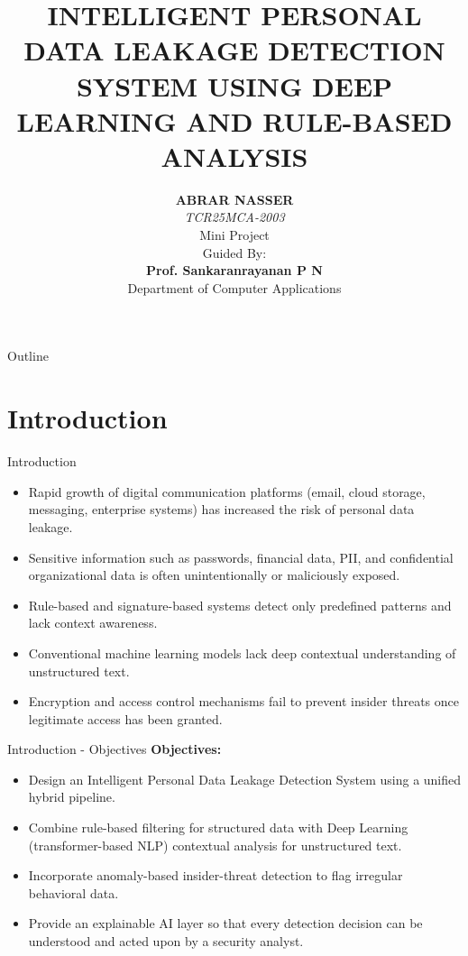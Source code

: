\documentclass{beamer}
\title{INTELLIGENT PERSONAL DATA LEAKAGE DETECTION SYSTEM USING DEEP LEARNING AND RULE-BASED ANALYSIS}
\author{\textbf{ABRAR NASSER} \\ \textit{TCR25MCA-2003} \\[0.6cm]     
    Mini Project  \\[13mm]     
    Guided By: \\
    \textbf{Prof. Sankaranrayanan P N} \\[0.3cm]
    Department of Computer Applications
}
\date{}
\begin{document}
\begin{frame}[plain]
  \titlepage
\end{frame}

\begin{frame}[allowframebreaks]{Outline}
\setlength{\parskip}{1pt}   
\setlength{\itemsep}{2pt}   
\tableofcontents[
    sectionstyle=show/show,     
    subsectionstyle=hide,       
    subsubsectionstyle=hide
]
\end{frame}

\section{Introduction}
\begin{frame}{Introduction}
\begin{itemize}
  \justifying
  \item Rapid growth of digital communication platforms (email, cloud storage, messaging, enterprise systems) has increased the risk of personal data leakage.
  \item Sensitive information such as passwords, financial data, PII, and confidential organizational data is often unintentionally or maliciously exposed.
  \item Rule-based and signature-based systems detect only predefined patterns and lack context awareness.
  \item Conventional machine learning models lack deep contextual understanding of unstructured text.
  \item Encryption and access control mechanisms fail to prevent insider threats once legitimate access has been granted.
\end{itemize}
\end{frame}

\begin{frame}{Introduction - Objectives}
\textbf{Objectives:}
\vspace{0.3cm}
\begin{itemize}
    \justifying
    \item Design an Intelligent Personal Data Leakage Detection System using a unified hybrid pipeline.
    \item Combine rule-based filtering for structured data with Deep Learning (transformer-based NLP) contextual analysis for unstructured text.
    \item Incorporate anomaly-based insider-threat detection to flag irregular behavioral data.
    \item Provide an explainable AI layer so that every detection decision can be understood and acted upon by a security analyst.
\end{itemize}
\end{frame}
\end{document}
